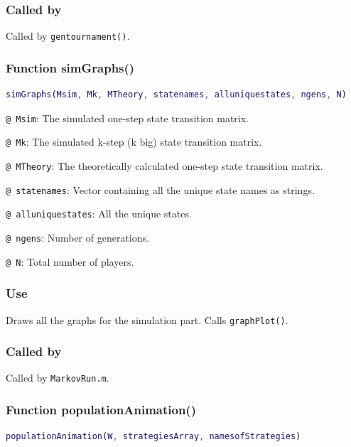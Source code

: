 \documentclass[12pt]{report}
\begin{document}
\subsubsection*{Called by}
Called by \texttt{gentournament()}.








\subsubsection*{Function simGraphs()}

\begin{lstlisting}[language=Matlab]
simGraphs(Msim, Mk, MTheory, statenames, alluniquestates, ngens, N)

\end{lstlisting}

\texttt{@ Msim}: The simulated one-step state transition matrix.

\texttt{@ Mk}: The simulated k-step (k big) state transition matrix.

\texttt{@ MTheory}: The theoretically calculated one-step state transition matrix.

\texttt{@ statenames}: Vector containing all the unique state names as strings.

\texttt{@ alluniquestates}: All the unique states.

\texttt{@ ngens}: Number of generations.

\texttt{@ N}: Total number of players.

\subsubsection*{Use}
Draws all the graphs for the simulation part. Calls \texttt{graphPlot()}.

\subsubsection*{Called by}
Called by \texttt{MarkovRun.m}.








\subsubsection*{Function populationAnimation()}

\begin{lstlisting}[language=Matlab]
populationAnimation(W, strategiesArray, namesofStrategies)

\end{lstlisting}
\end{document}
